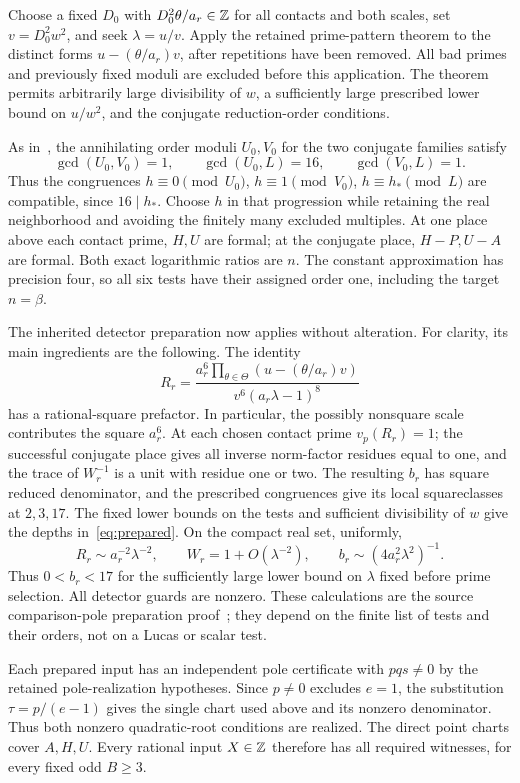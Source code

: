 \documentclass[11pt,a4paper]{article}
\begin{document}
Choose a fixed $D_0$ with $D_0^2\theta/a_r\in\mathbb Z$ for all
contacts and both scales, set $v=D_0^2w^2$, and seek
$\lambda=u/v$. Apply the retained prime-pattern theorem to
the distinct forms $u-(\theta/a_r)v$, after repetitions have
been removed. All bad primes and previously fixed moduli are
excluded before this application. The theorem permits arbitrarily
large divisibility of $w$, a sufficiently large prescribed lower
bound on $u/w^2$, and the conjugate reduction-order conditions.

As in~\cite{Dependencies,Baseline}, the annihilating order moduli
$U_0,V_0$ for the two conjugate families satisfy
\[
 \gcd(U_0,V_0)=1,\qquad \gcd(U_0,L)=16,\qquad\gcd(V_0,L)=1.
\]
Thus the congruences
$h\equiv0\pmod{U_0}$, $h\equiv1\pmod{V_0}$,
$h\equiv h_*\pmod L$ are compatible, since $16\mid h_*$.
Choose $h$ in that
progression while retaining the real neighborhood and avoiding
the finitely many excluded multiples. At one place above each
contact prime, $H,U$ are formal; at the conjugate place,
$H-P,U-A$ are formal. Both exact logarithmic ratios are $n$.
The constant approximation has precision four, so all six tests
have their assigned order one, including the target $n=\beta$.

The inherited detector preparation now applies without alteration.
For clarity, its main ingredients are the following. The identity
\[
 R_r=\frac{a_r^6\prod_{\theta\in\Theta}(u-(\theta/a_r)v)}
                  {v^6(a_r\lambda-1)^8}
\]
has a rational-square prefactor. In particular, the possibly nonsquare
scale contributes the square $a_r^6$.
At each chosen contact prime $v_p(R_r)=1$; the successful
conjugate place gives all inverse norm-factor residues equal to
one, and the trace of $W_r^{-1}$ is a unit with residue one or two.
The resulting $b_r$ has square reduced denominator, and the
prescribed congruences give its local squareclasses at $2,3,17$.
The fixed lower bounds on the tests and sufficient divisibility
of $w$ give the depths in~\eqref{eq:prepared}.
On the compact real set, uniformly,
\[
 R_r\sim a_r^{-2}\lambda^{-2},\qquad
 W_r=1+O(\lambda^{-2}),\qquad
 b_r\sim(4a_r^2\lambda^2)^{-1}.
\]
Thus $0<b_r<17$ for the sufficiently large lower bound on
$\lambda$ fixed before prime selection. All detector guards
are nonzero. These calculations are the source comparison-pole
preparation proof~\cite{Baseline}; they depend on the finite
list of tests and their orders, not on a Lucas or scalar test.

Each prepared input has an independent pole certificate with
$pqs\ne0$ by the retained pole-realization hypotheses.
Since $p\ne0$ excludes $e=1$, the substitution
$\tau=p/(e-1)$ gives the single chart used above and its
nonzero denominator. Thus both nonzero quadratic-root conditions
are realized. The direct point charts cover $A,H,U$.
Every rational input $X\in\mathbb Z$ therefore has all required
witnesses, for every fixed odd $B\ge3$.
\end{document}
